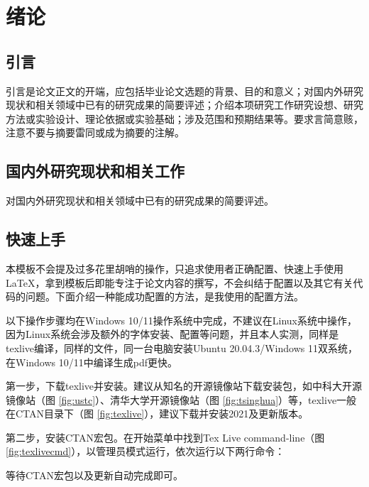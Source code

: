 
\chapter{绪论}
\label{cha:introduction}
\section{引言}
\label{sec:prologue}
引言是论文正文的开端，应包括毕业论文选题的背景、目的和意义；对国内外研究现状和相关领域中已有的研究成果的简要评述；介绍本项研究工作研究设想、研究方法或实验设计、理论依据或实验基础；涉及范围和预期结果等。要求言简意赅，注意不要与摘要雷同或成为摘要的注解。

\section{国内外研究现状和相关工作}
\label{sec:related_work}
对国内外研究现状和相关领域中已有的研究成果的简要评述。

\section{快速上手}
\label{sec:latex_basic}
本模板不会提及过多花里胡哨的操作，只追求使用者正确配置、快速上手使用LaTeX，拿到模板后即能专注于论文内容的撰写，不会纠结于配置以及其它有关代码的问题。下面介绍一种能成功配置的方法，是我使用的配置方法。

以下操作步骤均在Windows 10/11操作系统中完成，不建议在Linux系统中操作，因为Linux系统会涉及额外的字体安装、配置等问题，并且本人实测，同样是texlive编译，同样的文件，同一台电脑安装Ubuntu 20.04.3/Windows 11双系统，在Windows 10/11中编译生成pdf更快。

第一步，下载texlive并安装。建议从知名的开源镜像站下载安装包，如中科大开源镜像站（图 \ref{fig:ustc}）、清华大学开源镜像站（图 \ref{fig:tsinghua}）等，texlive一般在CTAN目录下（图 \ref{fig:texlive}），建议下载并安装2021及更新版本。




第二步，安装CTAN宏包。在开始菜单中找到Tex Live command-line（图 \ref{fig:texlivecmd}），以管理员模式运行，依次运行以下两行命令：

等待CTAN宏包以及更新自动完成即可。


